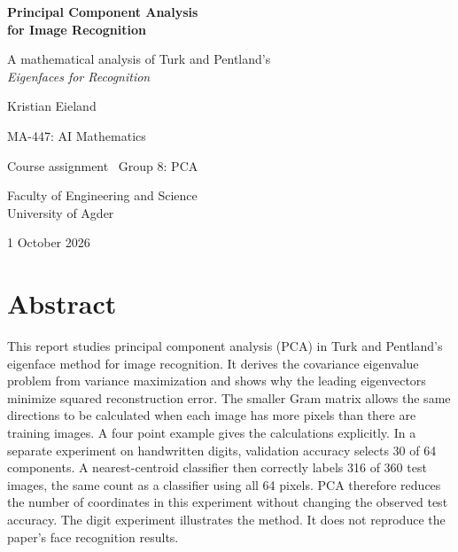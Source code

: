 \documentclass[11pt,a4paper,english]{article}
\numberwithin{equation}{section}
\begin{document}
\begin{titlepage}
\centering
\vspace*{4mm}
\par
\vspace{20mm}
{\color{uiaaccent}\LARGE\bfseries Principal Component Analysis\\[3mm] for Image Recognition\par}
\vspace{8mm}
{\large A mathematical analysis of Turk and Pentland's\\[2mm]\textit{Eigenfaces for Recognition}\par}
\vspace{17mm}
{\Large Kristian Eieland\par}
\vspace{8mm}
{\large MA-447: AI Mathematics\par}
\vspace{3mm}
Course assignment \textbullet\ Group 8: PCA\par
\vspace{13mm}

Faculty of Engineering and Science\\
University of Agder
\vfill
{\large 1 October 2026\par}
\vspace{8mm}
\end{titlepage}

\section*{Abstract}
This report studies principal component analysis (PCA) in Turk and Pentland's eigenface method for image recognition. It derives the covariance eigenvalue problem from variance maximization and shows why the leading eigenvectors minimize squared reconstruction error. The smaller Gram matrix allows the same directions to be calculated when each image has more pixels than there are training images. A four point example gives the calculations explicitly. In a separate experiment on handwritten digits, validation accuracy selects 30 of 64 components. A nearest-centroid classifier then correctly labels 316 of 360 test images, the same count as a classifier using all 64 pixels. PCA therefore reduces the number of coordinates in this experiment without changing the observed test accuracy. The digit experiment illustrates the method. It does not reproduce the paper's face recognition results.
\vspace{5mm}
\tableofcontents
\clearpage
{}
\end{document}
